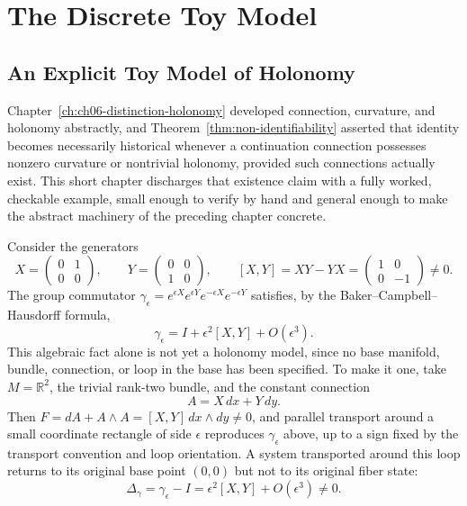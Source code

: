 
\chapter{The Discrete Toy Model}
\label{ch:ch09-discrete-toy-model}
\section{An Explicit Toy Model of Holonomy}

Chapter~\ref{ch:ch06-distinction-holonomy} developed connection, curvature, and holonomy abstractly, and Theorem~\ref{thm:non-identifiability} asserted that identity becomes necessarily historical whenever a continuation connection possesses nonzero curvature or nontrivial holonomy, provided such connections actually exist. This short chapter discharges that existence claim with a fully worked, checkable example, small enough to verify by hand and general enough to make the abstract machinery of the preceding chapter concrete.

Consider the generators
\[
X = \begin{pmatrix} 0 & 1 \\ 0 & 0 \end{pmatrix}, \qquad Y = \begin{pmatrix} 0 & 0 \\ 1 & 0 \end{pmatrix}, \qquad [X,Y] = XY - YX = \begin{pmatrix} 1 & 0 \\ 0 & -1 \end{pmatrix} \neq 0.
\]
The group commutator $\gamma_\epsilon = e^{\epsilon X} e^{\epsilon Y} e^{-\epsilon X} e^{-\epsilon Y}$ satisfies, by the Baker--Campbell--Hausdorff formula,
\[
\gamma_\epsilon = I + \epsilon^2 [X,Y] + O(\epsilon^3).
\]
This algebraic fact alone is not yet a holonomy model, since no base manifold, bundle, connection, or loop in the base has been specified. To make it one, take $M = \mathbb{R}^2$, the trivial rank-two bundle, and the constant connection
\[
A = X\, dx + Y\, dy.
\]
Then $F = dA + A \wedge A = [X,Y]\, dx \wedge dy \neq 0$, and parallel transport around a small coordinate rectangle of side $\epsilon$ reproduces $\gamma_\epsilon$ above, up to a sign fixed by the transport convention and loop orientation. A system transported around this loop returns to its original base point $(0,0)$ but not to its original fiber state:
\[
\Delta_\gamma = \gamma_\epsilon - I = \epsilon^2 [X,Y] + O(\epsilon^3) \neq 0.
\]

